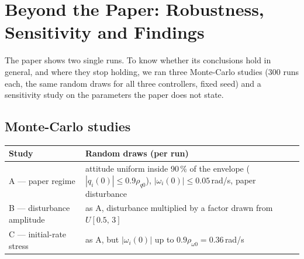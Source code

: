 \section{Beyond the Paper: Robustness, Sensitivity and Findings}
\label{sec:beyond}

The paper shows two single runs. To know whether its conclusions hold in general, and where they stop holding, we ran
three Monte-Carlo studies (300 runs each, the same random draws for all three controllers, fixed seed) and a
sensitivity study on the parameters the paper does not state.

\subsection{Monte-Carlo studies}
\label{sec:mc}

\begin{center}\small
\begin{tabularx}{\linewidth}{@{}l X@{}}
\toprule
\textbf{Study} & \textbf{Random draws (per run)}\\
\midrule
A --- paper regime & attitude uniform inside 90\,\% of the envelope ($|q_i(0)|\le0.9\rho_{q0}$), $|\omega_i(0)|\le0.05$\,rad/s, paper disturbance\\
B --- disturbance amplitude & as A, disturbance multiplied by a factor drawn from $U[0.5,\,3]$\\
C --- initial-rate stress & as A, but $|\omega_i(0)|$ up to $0.9\rho_{\omega0}=0.36$\,rad/s\\
\bottomrule
\end{tabularx}
\end{center}


